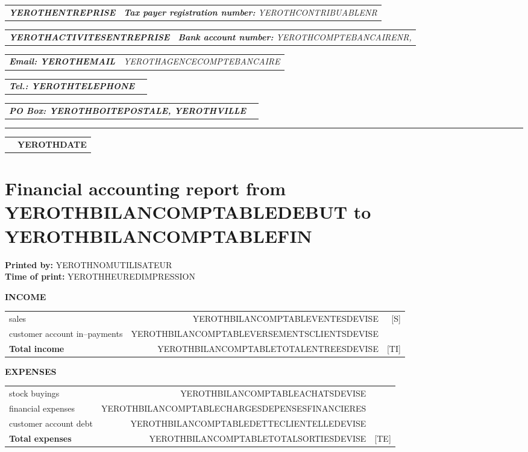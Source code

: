 \documentclass[11pt,YEROTHPAPERSPEC,landscape]{article} %
\makeatletter
\newcommand{\headerrow}[2]
{\begin{tabular*}{\linewidth}{l@{\extracolsep{\fill}}r}
	#1 &
	#2 \\
\end{tabular*}}
\newcommand{\emphbold}[1]{\textbf{\emph{#1}}\xspace}
\makeatother
\begin{document}
\bigskip

\headerrow
	{\emphbold{YEROTHENTREPRISE}}
	{\emph{\textbf{Tax payer registration number:} YEROTHCONTRIBUABLENR}}
\headerrow
	{\emphbold{YEROTHACTIVITESENTREPRISE}}
	{\emph{\textbf{Bank account number:} YEROTHCOMPTEBANCAIRENR,}}
\headerrow
	{\emphbold{Email: YEROTHEMAIL}}
	{\emph{YEROTHAGENCECOMPTEBANCAIRE}}
\headerrow
	{\emphbold{Tel.: YEROTHTELEPHONE}}
	{}
\headerrow
	{\emphbold{PO Box: YEROTHBOITEPOSTALE, YEROTHVILLE}}
	{}
	
\hrule

\headerrow
	{}
	{\textbf{YEROTHDATE}}

\section*{Financial accounting report from YEROTHBILANCOMPTABLEDEBUT to YEROTHBILANCOMPTABLEFIN}

\textbf{Printed by:} YEROTHNOMUTILISATEUR\\
\textbf{Time of print:} YEROTHHEUREDIMPRESSION\\

\vspace{0.3cm}

\vspace{1cm}
\textbf{INCOME}
\begin{table}[!htbp]
\begin{tabular}{lrr}
sales  				&  YEROTHBILANCOMPTABLEVENTESDEVISE  			& [S] \\ 
customer account in--payments  	&  YEROTHBILANCOMPTABLEVERSEMENTSCLIENTSDEVISE  & \\ \hline
\textbf{Total income}  		&  YEROTHBILANCOMPTABLETOTALENTREESDEVISE & [TI] \\	 
\end{tabular}
\end{table}


\vspace{1cm}
\textbf{EXPENSES}
\begin{table}[!htbp]
\begin{tabular}{lrr}
stock buyings  				&  YEROTHBILANCOMPTABLEACHATSDEVISE  							& \\ 
financial expenses 			&  YEROTHBILANCOMPTABLECHARGESDEPENSESFINANCIERES  				& \\ 
customer account debt\footnotemark  		&  YEROTHBILANCOMPTABLEDETTECLIENTELLEDEVISE 	&  \\ \hline
\textbf{Total expenses}  	&  YEROTHBILANCOMPTABLETOTALSORTIESDEVISE & [TE] \\
\end{tabular}
\end{table}
\end{document}
